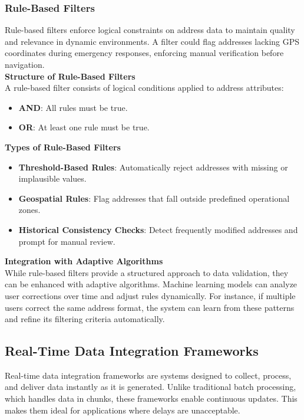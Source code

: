         
        \subsubsection{Rule-Based Filters}
        \label{sssec:rule-based-filters}
        
        Rule-based filters enforce logical constraints on address data to maintain quality and relevance in dynamic environments. A filter could flag addresses lacking GPS coordinates during emergency responses, enforcing manual verification before navigation.\\
        
        
        \textbf{Structure of Rule-Based Filters}\\
        A rule-based filter consists of logical conditions applied to address attributes:
        \begin{itemize}
            \item \textbf{AND}: All rules must be true.
            \item \textbf{OR}: At least one rule must be true.
        \end{itemize}
        

        \textbf{Types of Rule-Based Filters}
        \begin{itemize}
            \item \textbf{Threshold-Based Rules}: Automatically reject addresses with missing or implausible values.
            \item \textbf{Geospatial Rules}: Flag addresses that fall outside predefined operational zones.
            \item \textbf{Historical Consistency Checks}: Detect frequently modified addresses and prompt for manual review.
        \end{itemize}
        
        \textbf{Integration with Adaptive Algorithms}\\
        While rule-based filters provide a structured approach to data validation, they can be enhanced with adaptive algorithms. Machine learning models can analyze user corrections over time and adjust rules dynamically. For instance, if multiple users correct the same address format, the system can learn from these patterns and refine its filtering criteria automatically.
        

    \subsection{Real-Time Data Integration Frameworks}
    Real-time data integration frameworks are systems designed to collect, process, and deliver data instantly as it is generated. Unlike traditional batch processing, which handles data in chunks, these frameworks enable continuous updates. This makes them ideal for applications where delays are unacceptable.

